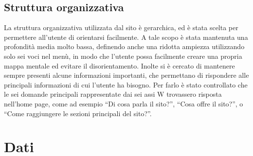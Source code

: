 \documentclass[10pt,a4paper,onecolumn]{article}
\begin{document}
\subsection{Struttura organizzativa}

La struttura organizzativa utilizzata dal sito è gerarchica, ed è stata scelta per permettere all'utente di orientarsi facilmente. A tale scopo è stata mantenuta una profondità media molto bassa, definendo anche una ridotta ampiezza utilizzando solo sei voci nel menù, in modo che l'utente possa facilmente creare una propria mappa mentale ed evitare il disorientamento.
Inolte si è cercato di mantenere sempre presenti alcune informazioni importanti, che permettano di rispondere alle principali informazioni di cui l'utente ha bisogno. Per farlo è stato controllato che le sei domande principali rappresentate dai sei assi W trovassero risposta nell'home page, come ad esempio ``Di cosa parla il sito?'', ``Cosa offre il sito?'', o ``Come raggiungere le sezioni principali del sito?''.

\section{Dati}
\end{document}
